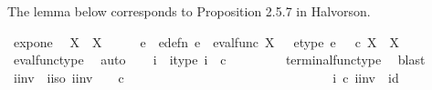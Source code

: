 \begin{isabellebody}
%
\isadelimproof
%
\endisadelimproof
%
\isadelimdocument
%
\endisadelimdocument
%
\isatagdocument
%
\isamarkuptrue%
%
\endisatagdocument
{\isafolddocument}%
%
\isadelimdocument
%
\endisadelimdocument
%
\begin{isamarkuptext}%
The lemma below corresponds to Proposition 2.5.7 in Halvorson.%
\end{isamarkuptext}\isamarkuptrue%
\isamarkupfalse%
\ exp{\isacharunderscore}{\kern0pt}one{\isacharcolon}{\kern0pt}\isanewline
\ \ {\isachardoublequoteopen}X\isactrlbsup {\isasymone}\isactrlesup \ {\isasymcong}\ X{\isachardoublequoteclose}\isanewline
%
\isadelimproof
%
\endisadelimproof
%
\isatagproof
{}\isamarkupfalse%
\ {\isacharminus}{\kern0pt}\isanewline
\ \ \isamarkupfalse%
\ e\ \ e{\isacharunderscore}{\kern0pt}defn{\isacharcolon}{\kern0pt}\ {\isachardoublequoteopen}e\ {\isacharequal}{\kern0pt}\ eval{\isacharunderscore}{\kern0pt}func\ X\ {\isasymone}{\isachardoublequoteclose}\ \ e{\isacharunderscore}{\kern0pt}type{\isacharcolon}{\kern0pt}\ {\isachardoublequoteopen}e\ {\isacharcolon}{\kern0pt}\ {\isasymone}\ {\isasymtimes}\isactrlsub c\ X\isactrlbsup {\isasymone}\isactrlesup \ {\isasymrightarrow}\ X{\isachardoublequoteclose}\isanewline
\ \ \ \ \isamarkupfalse%
\ eval{\isacharunderscore}{\kern0pt}func{\isacharunderscore}{\kern0pt}type\ \isamarkupfalse%
\ auto\isanewline
\ \ \isamarkupfalse%
\ i\ \ i{\isacharunderscore}{\kern0pt}type{\isacharcolon}{\kern0pt}\ {\isachardoublequoteopen}i{\isacharcolon}{\kern0pt}\ {\isasymone}\ {\isasymtimes}\isactrlsub c\ {\isasymone}\ {\isasymrightarrow}\ {\isasymone}{\isachardoublequoteclose}\isanewline
\ \ \ \ \isamarkupfalse%
\ terminal{\isacharunderscore}{\kern0pt}func{\isacharunderscore}{\kern0pt}type\ \isamarkupfalse%
\ blast\isanewline
\ \ \isamarkupfalse%
\ i{\isacharunderscore}{\kern0pt}inv\ \ i{\isacharunderscore}{\kern0pt}iso{\isacharcolon}{\kern0pt}\ {\isachardoublequoteopen}i{\isacharunderscore}{\kern0pt}inv{\isacharcolon}{\kern0pt}\ {\isasymone}{\isasymrightarrow}\ \ {\isasymone}\ {\isasymtimes}\isactrlsub c\ {\isasymone}\ {\isasymand}\ \isanewline
\ \ \ \ \ \ \ \ \ \ \ \ \ \ \ \ \ \ \ \ \ \ \ \ \ \ \ \ \ i\ {\isasymcirc}\isactrlsub c\ i{\isacharunderscore}{\kern0pt}inv\ {\isacharequal}{\kern0pt}\ id{\isacharparenleft}{\kern0pt}{\isasymone}{\isacharparenright}{\kern0pt}\ {\isasymand}\ \ \isanewline

\end{isabellebody}
